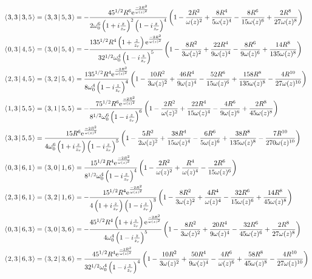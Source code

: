 \documentclass[11pt]{amsart}
\makeatletter
\newcommand{\e}{{\rm e}}				%
\newcommand{\msp}[1]{\mspace{#1mu}}		%
\newcommand{\0}{\varnothing}		%
\newcommand{\brac}[2]{\left\langle\msp{2} #1\left\lvert \msp{3.5} #2 \right.\right\rangle}	%
\newcommand{\1}{!}
\newcommand{\2}{@}
\newcommand{\3}{\#}
\newcommand{\4}{\$}
\newcommand{\5}{\%}
\newcommand{\6}{$^\wedge$}
\newcommand{\7}{\&}
\newcommand{\8}{*}
\newcommand{\9}{(}
\makeatother
\begin{document}
\begin{align*}
&\brac{3,3}{3,5} = \brac{3,3}{5,3} = -\frac{45^{1/2}R^6\e^{\frac{-2R^2}{\omega(z)^2}}}{2\omega_0^6\left(1+i\frac{z}{z_r}\right)^2\left(1-i\frac{z}{z_r}\right)^4}\left(1-\frac{2R^2}{\omega(z)^2}+\frac{8R^4}{5\omega(z)^4}-\frac{8R^6}{15\omega(z)^6}+\frac{2R^8}{27\omega(z)^8}\right)
\\
&
\brac{0,3}{4,5} = \brac{3,0}{5,4} =- \frac{135^{1/2}R^4\left(1+\frac{z}{z_r}\right)\e^{\frac{-2R^2}{\omega(z)^2}}}{32^{1/2}\omega_0^4\left(1-i\frac{z}{z_r}\right)^5}\left(1-\frac{8R^2}{3\omega(z)^2}+\frac{22R^4}{9\omega(z)^4}-\frac{8R^6}{9\omega(z)^6}+\frac{14R^8}{135\omega(z)^8}\right)
\\
&
\brac{2,3}{4,5}=\brac{3,2}{5,4} =\frac{135^{1/2}R^4\e^{\frac{-2R^2}{\omega(z)^2}}}{8\omega_0^4\left(1-i\frac{z}{z_r}\right)^4}\left(1-\frac{10R^2}{3\omega(z)^2}+\frac{46R^4}{9\omega(z)^4}-\frac{52R^6}{15\omega(z)^6}+\frac{158R^8}{135\omega(z)^8}-\frac{4R^{10}}{27\omega(z)^{10}}\right)
\\
&
\brac{1,3}{5,5} = \brac{3,1}{5,5} =- \frac{75^{1/2}R^6\e^{\frac{-2R^2}{\omega(z)^2}}}{8^{1/2}\omega_0^6\left(1-i\frac{z}{z_r}\right)^6}\left(1-\frac{2R^2}{\omega(z)^2}+\frac{22R^4}{15\omega(z)^4}-\frac{4R^6}{9\omega(z)^6}+\frac{2R^8}{45\omega(z)^8}\right)
\\
&
\brac{3,3}{5,5} = \frac{15R^6\e^{\frac{-2R^2}{\omega(z)^2}}}{4\omega_0^6\left(1+i\frac{z}{z_r}\right)\left(1-i\frac{z}{z_r}\right)^5}\left(1-\frac{5R^2}{2\omega(z)^2}+\frac{38R^4}{15\omega(z)^4}-\frac{6R^6}{5\omega(z)^6}+\frac{38R^8}{135\omega(z)^8}-\frac{7R^{10}}{270\omega(z)^{10}}\right)
\\
&
\brac{0,3}{6,1} = \brac{3,0}{1,6} = \frac{15^{1/2}R^4\e^{\frac{-2R^2}{\omega(z)^2}}}{8^{1/2}\omega_0^4\left(1-i\frac{z}{z_r}\right)^4}\left(1-\frac{2R^2}{\omega(z)^2}+\frac{R^4}{\omega(z)^4}-\frac{2R^6}{15\omega(z)^6}\right)
\\
&
\brac{2,3}{6,1} = \brac{3,2}{1,6} =-\frac{15^{1/2}R^4\e^{\frac{-2R^2}{\omega(z)^2}}}{4\left(1+i\frac{z}{z_r}\right)\left(1-i\frac{z}{z_r}\right)^3}\left(1-\frac{8R^2}{3\omega(z)^2}+\frac{4R^4}{\omega(z)^4}-\frac{32R^6}{15\omega(z)^6}+\frac{14R^8}{45\omega(z)^8}\right)\\
&
\brac{0,3}{6,3} = \brac{3,0}{3,6} =-\frac{45^{1/2}R^4\left(1+i\frac{z}{z_r}\right)\e^{\frac{-2R^2}{\omega(z)^2}}}{4\omega_0^4\left(1-i\frac{z}{z_r}\right)^5}\left(1-\frac{8R^2}{3\omega(z)^2}+\frac{20R^4}{9\omega(z)^4}-\frac{32R^6}{45\omega(z)^6}+\frac{2R^8}{27\omega(z)^8}\right)
\\
&
\brac{2,3}{6,3} = \brac{3,2}{3,6} =\frac{45^{1/2}R^4\e^{\frac{-2R^2}{\omega(z)^2}}}{32^{1/2}\omega_0^4\left(1-i\frac{z}{z_r}\right)^4}\left(1-\frac{10R^2}{3\omega(z)^2}+\frac{50R^4}{9\omega(z)^4}-\frac{4R^6}{\omega(z)^6}+\frac{58R^8}{45\omega(z)^8}-\frac{4R^{10}}{27\omega(z)^{10}}\right)

\end{align*}
\end{document}
